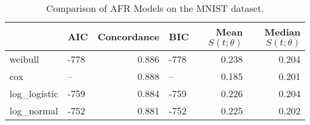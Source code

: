 \begin{table}
\caption{Comparison of AFR Models on the MNIST dataset.}
\label{tab:mnist}
\begin{tabular}{llrlrr}
\toprule
 & AIC & Concordance & BIC & Mean $S(t;\theta)$ & Median $S(t;\theta)$ \\
\midrule
weibull & -778 & 0.886 & -778 & 0.238 & 0.204 \\
cox & -- & 0.888 & -- & 0.185 & 0.201 \\
log_logistic & -759 & 0.884 & -759 & 0.226 & 0.204 \\
log_normal & -752 & 0.881 & -752 & 0.225 & 0.202 \\
\bottomrule
\end{tabular}
\end{table}
